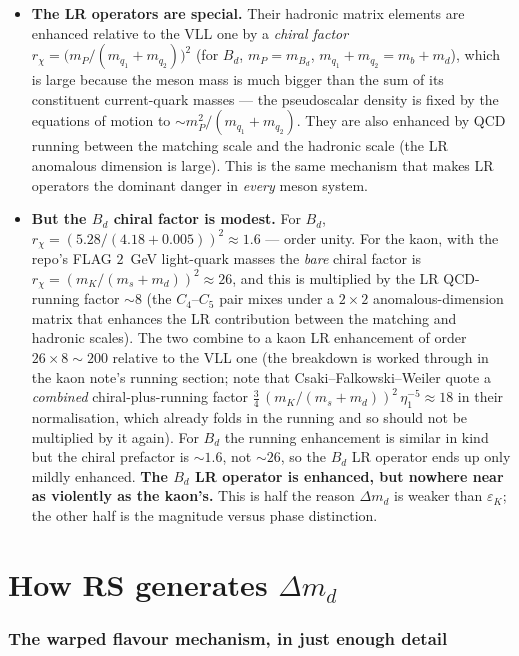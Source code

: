 \documentclass[11pt]{article}
\newcommand{\dmd}{\Delta m_d}
\newcommand{\epsK}{\varepsilon_K}
\theoremstyle{definition}
\begin{document}
\begin{itemize}[leftmargin=1.4em]
\item \textbf{The LR operators are special.} Their hadronic matrix elements are
enhanced relative to the VLL one by a \emph{chiral factor}
$r_\chi = \big(m_P/(m_{q_1}+m_{q_2})\big)^2$ (for $B_d$,
$m_P=m_{B_d}$, $m_{q_1}+m_{q_2}=m_b+m_d$), which is large because the meson mass
is much bigger than the sum of its constituent current-quark masses --- the
pseudoscalar density is fixed by the equations of motion to $\sim m_P^2/(m_{q_1}+m_{q_2})$.
They are also enhanced
by QCD running between the matching scale and the hadronic scale (the LR
anomalous dimension is large). This is the same mechanism that makes LR operators
the dominant danger in \emph{every} meson system.
\item \textbf{But the $B_d$ chiral factor is modest.} For $B_d$,
$r_\chi=(5.28/(4.18+0.005))^2\approx 1.6$ --- order unity. For the kaon, with the
repo's FLAG $2$~GeV light-quark masses the \emph{bare} chiral factor is
$r_\chi=(m_K/(m_s+m_d))^2\approx 26$, and this is multiplied by the LR QCD-running
factor $\sim8$ (the $C_4$--$C_5$ pair mixes under a $2\times2$ anomalous-dimension
matrix that enhances the LR contribution between the matching and hadronic
scales). The two combine to a kaon LR enhancement of order
$26\times8\sim200$ relative to the VLL one
(the breakdown is worked through in the kaon note's running section; note that
Csaki--Falkowski--Weiler quote a \emph{combined} chiral-plus-running factor
$\tfrac34\,(m_K/(m_s+m_d))^2\,\eta_1^{-5}\approx18$ in their normalisation, which
already folds in the running and so should not be multiplied by it again). For
$B_d$ the running enhancement is similar in kind but the chiral prefactor is
$\sim1.6$, not $\sim26$, so the $B_d$ LR operator ends up only mildly enhanced.
\textbf{The $B_d$ LR operator is enhanced, but nowhere near as violently as the
kaon's.} This is half the reason $\dmd$ is weaker than $\epsK$; the other half is
the magnitude versus phase distinction.
\end{itemize}

\part{How RS generates $\Delta m_d$}
\label{part:rs}

\section{The warped flavour mechanism, in just enough detail}
\label{sec:rsmech}
\end{document}
